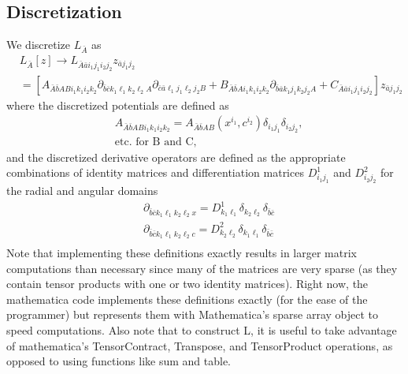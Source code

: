 \documentclass[aps,prd,amsmath,showpacs,amssymb,superscriptaddress,nofootinbib,longbibliography,eqsecnum,preprintnumbers]{revtex4-1}
\begin{document}
\subsection{Discretization}
We discretize $L_{\bar A}$ as 
\begin{align}
&L_{\bar A}[z]\to L_{\bar A \bar a i_1 j_1 i_2 j_2}z_{\bar a j_1 j_2}
\nonumber \\
&=\left[A_{\bar A \bar b ABi_1k_1i_2k_2}\partial_{\bar b \bar c k_1 \ell_1k_2\ell_2A}\partial_{\bar c\bar a \ell_1 j_1\ell_2j_2B}
+B_{\bar A \bar b Ai_1k_1i_2k_2}\partial_{\bar b \bar a k_1j_1k_2j_2A}
+C_{\bar A\bar a i_1 j_1 i_2 j_2}
\right]z_{\bar a j_1 j_2}
\end{align}
where the discretized potentials are defined as 
\begin{align}
&A_{\bar A \bar b ABi_1k_1i_2k_2}=
A_{\bar A\bar b AB}(x^{i_1},c^{i_2})\delta_{i_1j_1}\delta_{i_2j_2}, \nonumber \\
& \text{etc. for B and C,}
\end{align}
and the discretized derivative operators are defined as the appropriate combinations of identity matrices and differentiation matrices $D^1_{i_1j_1}$ and $D^2_{i_2 j_2}$ for the radial and angular domains
\begin{align}
&\partial_{\bar b \bar c k_1 \ell_1k_2\ell_2 x}=D^1_{k_1 \ell_1}\delta_{k_2\ell_2}\delta_{\bar b \bar c}\nonumber \\
&\partial_{\bar b \bar c k_1 \ell_1k_2\ell_2 c}=D^2_{k_2 \ell_2}\delta_{k_1\ell_1}\delta_{\bar b \bar c}\nonumber \\
\end{align}
Note that implementing these definitions exactly results in larger matrix computations than necessary since many of the matrices are very sparse (as they contain tensor products with one or two identity matrices). Right now, the mathematica code implements these definitions exactly (for the ease of the programmer) but represents them with Mathematica's sparse array object to speed computations. Also note that to construct L, it is useful to take advantage of mathematica's TensorContract, Transpose, and TensorProduct operations, as opposed to using functions like sum and table.






 

\end{document}
